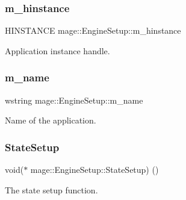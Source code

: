 \subsubsection{\texorpdfstring{m\+\_\+hinstance}{m\_hinstance}}
{\footnotesize\ttfamily H\+I\+N\+S\+T\+A\+N\+CE mage\+::\+Engine\+Setup\+::m\+\_\+hinstance}

Application instance handle. \hypertarget{structmage_1_1_engine_setup_a3866920e44c0752a89265f9f0c5c5d05}{}\label{structmage_1_1_engine_setup_a3866920e44c0752a89265f9f0c5c5d05} 
\subsubsection{\texorpdfstring{m\+\_\+name}{m\_name}}
{\footnotesize\ttfamily wstring mage\+::\+Engine\+Setup\+::m\+\_\+name}

Name of the application. \hypertarget{structmage_1_1_engine_setup_a36a3c8a316c63e6c90ee9dd6efb82c0c}{}\label{structmage_1_1_engine_setup_a36a3c8a316c63e6c90ee9dd6efb82c0c} 
\subsubsection{\texorpdfstring{State\+Setup}{StateSetup}}
{\footnotesize\ttfamily void($\ast$ mage\+::\+Engine\+Setup\+::\+State\+Setup) ()}

The state setup function. 